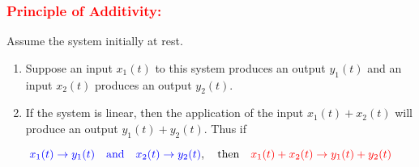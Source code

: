 \documentclass[../notes-main.tex]{subfiles}
\begin{document}
\subsubsection{\textcolor{red}{Principle of Additivity:}} Assume the system initially at rest.
\begin{enumerate}[label=\blacktriangleright, leftmargin=*, itemsep=0.5em]
    \item Suppose an input \(x_1(t)\) to this system produces an output \(y_1(t)\) and an input \(x_2(t)\) produces an output \(y_2(t)\).
    \item If the system is linear, then the application of the input \(x_1(t) + x_2(t)\) will produce an output \(y_1(t) + y_2(t)\). Thus if
\end{enumerate}
\begin{equation}
    \textcolor{blue}{x_1(t) \rightarrow y_1(t) \quad \text{and} \quad x_2(t) \rightarrow y_2(t)}, \quad \text{then} \quad \textcolor{red}{x_1(t) + x_2(t) \rightarrow y_1(t) + y_2(t)}
    \label{eq:linear-system-additive-property}
\end{equation}
\end{document}
